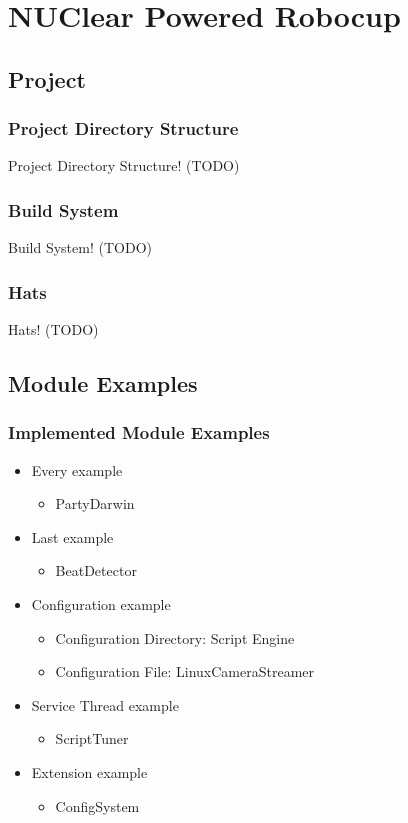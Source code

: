 \documentclass{beamer}
\begin{document}
\section{NUClear Powered Robocup}
\subsection{Project}
\begin{frame}
	\frametitle{Project Directory Structure}
	Project Directory Structure! (TODO)
\end{frame}

\begin{frame}
	\frametitle{Build System}
	Build System! (TODO)
\end{frame}

\begin{frame}
	\frametitle{Hats}
	Hats! (TODO)
\end{frame}

\subsection{Module Examples}
\begin{frame}
	\frametitle{Implemented Module Examples}
	\begin{itemize}
		\item Every example
			\begin{itemize}
				\item PartyDarwin
			\end{itemize}
			
		\item Last example
			\begin{itemize}
				\item BeatDetector
			\end{itemize}
			
		\item Configuration example
			\begin{itemize}
				\item Configuration Directory: Script Engine
				\item Configuration File: LinuxCameraStreamer
			\end{itemize}
			
		\item Service Thread example
			\begin{itemize}
				\item ScriptTuner
			\end{itemize}
			
		\item Extension example
			\begin{itemize}
				\item ConfigSystem
			\end{itemize}
	\end{itemize}
\end{frame}
\end{document}
